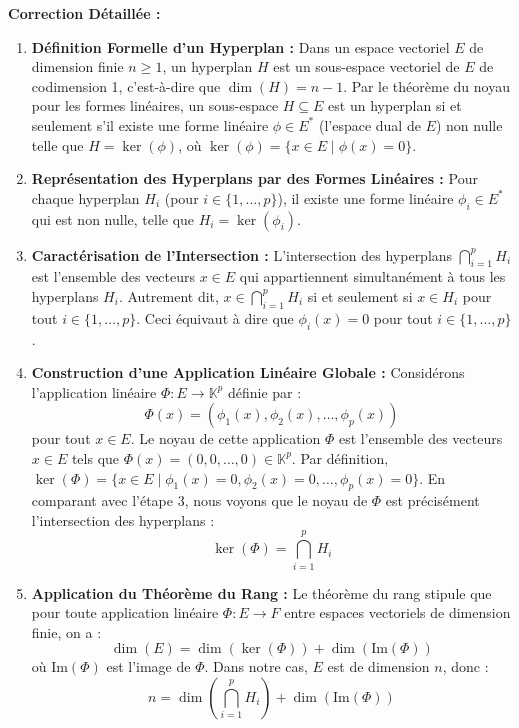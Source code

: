 \documentclass[11pt,a4paper]{report}
\begin{document}
\textbf{Correction Détaillée :}

\begin{enumerate}
\def\labelenumi{\arabic{enumi}.}
\item
  \textbf{Définition Formelle d'un Hyperplan :} Dans un espace vectoriel
  \(E\) de dimension finie \(n \ge 1\), un hyperplan \(H\) est un
  sous-espace vectoriel de \(E\) de codimension 1, c'est-à-dire que
  \(\dim(H) = n-1\). Par le théorème du noyau pour les formes linéaires,
  un sous-espace \(H \subseteq E\) est un hyperplan si et seulement s'il
  existe une forme linéaire \(\phi \in E^*\) (l'espace dual de \(E\))
  non nulle telle que \(H = \ker(\phi)\), où
  \(\ker(\phi) = \{x \in E \mid \phi(x) = 0\}\).
\item
  \textbf{Représentation des Hyperplans par des Formes Linéaires :} Pour
  chaque hyperplan \(H_i\) (pour \(i \in \{1, \dots, p\}\)), il existe
  une forme linéaire \(\phi_i \in E^*\) qui est non nulle, telle que
  \(H_i = \ker(\phi_i)\).
\item
  \textbf{Caractérisation de l'Intersection :} L'intersection des
  hyperplans \(\bigcap_{i=1}^p H_i\) est l'ensemble des vecteurs
  \(x \in E\) qui appartiennent simultanément à tous les hyperplans
  \(H_i\). Autrement dit, \(x \in \bigcap_{i=1}^p H_i\) si et seulement
  si \(x \in H_i\) pour tout \(i \in \{1, \dots, p\}\). Ceci équivaut à
  dire que \(\phi_i(x) = 0\) pour tout \(i \in \{1, \dots, p\}\).
\item
  \textbf{Construction d'une Application Linéaire Globale :} Considérons
  l'application linéaire \(\Phi : E \to \mathbb{K}^p\) définie par :
  \[ \Phi(x) = (\phi_1(x), \phi_2(x), \dots, \phi_p(x)) \] pour tout
  \(x \in E\). Le noyau de cette application \(\Phi\) est l'ensemble des
  vecteurs \(x \in E\) tels que
  \(\Phi(x) = (0, 0, \dots, 0) \in \mathbb{K}^p\). Par définition,
  \(\ker(\Phi) = \{x \in E \mid \phi_1(x) = 0, \phi_2(x) = 0, \dots, \phi_p(x) = 0\}\).
  En comparant avec l'étape 3, nous voyons que le noyau de \(\Phi\) est
  précisément l'intersection des hyperplans :
  \[ \ker(\Phi) = \bigcap_{i=1}^p H_i \]
\item
  \textbf{Application du Théorème du Rang :} Le théorème du rang stipule
  que pour toute application linéaire \(\Phi : E \to F\) entre espaces
  vectoriels de dimension finie, on a :
  \[ \dim(E) = \dim(\ker(\Phi)) + \dim(\text{Im}(\Phi)) \] où
  \(\text{Im}(\Phi)\) est l'image de \(\Phi\). Dans notre cas, \(E\) est
  de dimension \(n\), donc :
  \[ n = \dim\left(\bigcap_{i=1}^p H_i\right) + \dim(\text{Im}(\Phi)) \]

\end{enumerate}
\end{document}
